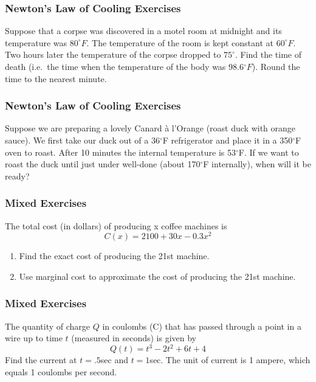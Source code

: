 \documentclass[xcolor=dvipsnames]{beamer}
\begin{document}
\begin{frame}
  \frametitle{Newton's Law of Cooling Exercises}
  {\ubung} Suppose that a corpse was discovered in a motel room at
  midnight and its temperature was $80^{\circ}F$. The temperature of
  the room is kept constant at $60^{\circ}F$. Two hours later the
  temperature of the corpse dropped to $75^{\circ}$. Find the time of
  death (i.e.\ the time when the temperature of the body was
  98.6$^{\circ}F$). Round the time to the nearest minute.
\end{frame}

\begin{frame}
  \frametitle{Newton's Law of Cooling Exercises}
  {\ubung} Suppose we are preparing a lovely Canard {\`a} l'Orange
  (roast duck with orange sauce). We first take our duck out of a
  36$^{\circ}$F refrigerator and place it in a 350$^{\circ}$F oven to
  roast. After 10 minutes the internal temperature is 53$^{\circ}$F.
  If we want to roast the duck until just under well-done (about
  170$^{\circ}$F internally), when will it be ready?
\end{frame}

\begin{frame}
  \frametitle{Mixed Exercises}
  {\ubung} The total cost (in dollars) of producing x coffee machines is
  \begin{equation}
    \label{eq:egaireil}
    C(x)=2100+30x-0.3x^{2}
  \end{equation}
  \begin{enumerate}
  \item Find the exact cost of producing the 21st machine.
  \item Use marginal cost to approximate the cost of producing the 21st machine.
  \end{enumerate}
\end{frame}

\begin{frame}
  \frametitle{Mixed Exercises}
  {\ubung} The quantity of charge $Q$ in coulombs (C) that has passed through a
  point in a wire up to time $t$ (measured in seconds) is given by
  \begin{equation}
    \label{eq:iehahphi}
    Q(t)=t^{3}−2t^{2}+6t+4  
  \end{equation}
Find the current at $t=.5$sec and $t=1$sec. The unit of current is 1
ampere, which equals 1 coulombs per second.
\end{frame}
\end{document}
